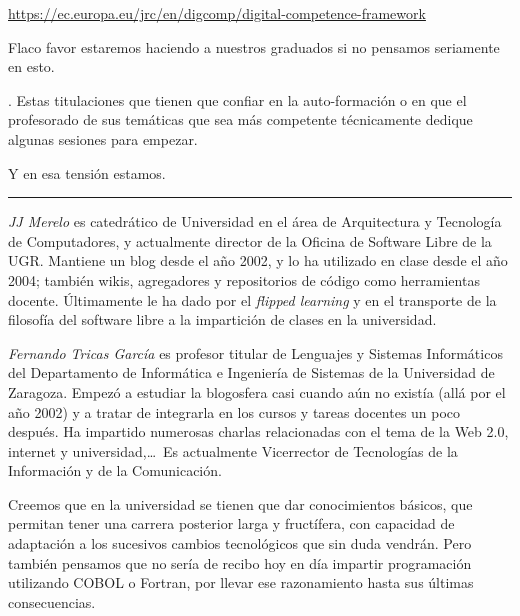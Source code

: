 \documentclass[twoside,10pt]{article}
\newcounter{num}
\begin{document}
\begin{multicols}{2}
{\url{https://ec.europa.eu/jrc/en/digcomp/digital-competence-framework}
	
Flaco favor estaremos haciendo a nuestros graduados si no pensamos seriamente en esto.}. 
Estas titulaciones que tienen que confiar en la auto-formación o en que el
profesorado de sus temáticas que sea más competente técnicamente dedique
algunas sesiones para empezar.

Y en esa tensión estamos.

\noindent\rule{86mm}{1pt}
\vspace{1ex} {\small{\begin{window} 
\noindent\emph{JJ Merelo} es catedrático de Universidad
en el área de Arquitectura y Tecnología de Computadores, y
actualmente director de la Oficina de Software Libre de la UGR.
Mantiene un blog desde el año 2002, y lo ha utilizado en clase desde
el año 2004; también wikis, agregadores y repositorios de código
como herramientas docente. Últimamente le ha dado por el \textsl{flipped
learning} y en el transporte de la filosofía del software libre a la
impartición de clases en la universidad.
\end{window}}}

\medskip

{\small{\begin{window}
		\noindent \emph{Fernando Tricas García} es profesor
		titular de Lenguajes y Sistemas Informáticos del Departamento
		de Informática e Ingeniería de Sistemas de la Universidad de
		Zaragoza.  Empezó a estudiar la blogosfera casi cuando aún no
		existía (allá por el año 2002) y a tratar de integrarla en los
		cursos y tareas docentes un poco después.  Ha impartido
		numerosas charlas relacionadas con el tema de la Web 2.0, 
		internet y universidad,\ldots\ 
		Es actualmente Vicerrector de Tecnologías de la Información y
de la Comunicación.   
		\end{window}}}




\noindent 
\bigskip

Creemos que en la universidad se tienen que dar conocimientos básicos,
que permitan tener una carrera posterior larga y fructífera, con
capacidad de adaptación a los sucesivos cambios tecnológicos que sin duda vendrán. 
Pero también pensamos que no sería de recibo hoy en día
impartir programación utilizando COBOL o Fortran, por llevar
ese razonamiento hasta sus últimas consecuencias. 



\end{multicols}
\end{document}
